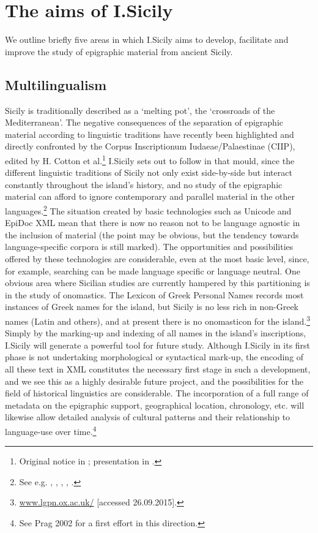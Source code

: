 \documentclass[amsthm,ebook]{saparticle}
\begin{document}
\section{The aims of I.Sicily}
\noindent We outline briefly five areas in which I.Sicily aims to develop, facilitate and improve the study of epigraphic material
from ancient Sicily.




\subsection{Multilingualism}


\noindent Sicily is traditionally described as a `melting pot', the `crossroads of the Mediterranean'. The negative consequences
of the separation of epigraphic material according to linguistic traditions have recently been highlighted and directly
confronted by the Corpus Inscriptionum Iudaeae/Palaestinae (CIIP), edited by H. Cotton et al.\footnote{ Original notice
in \citet{cotton_corpus_1999}; presentation in \citet{cotton_corpus_2010}.} I.Sicily sets out to follow in that mould, since the
different linguistic traditions of Sicily not only exist side-by-side but interact constantly throughout the island’s
history, and no study of the epigraphic material can afford to ignore contemporary and parallel material in the other
languages.\footnote{ See e.g. \citet{manganaro_greco_1993}, \citet{prag_epigraphy_2002}, \citet{salmeri_i_2004}, \citet{korhonen_language_2011}, \citet{tribulato_language_2012}.} The situation
created by basic technologies such as Unicode and EpiDoc XML mean that there is now no reason not to be language
agnostic in the inclusion of material (the point may be obvious, but the tendency towards language-specific corpora is
still marked). The opportunities and possibilities offered by these technologies are considerable, even at the most
basic level, since, for example, searching can be made language specific or language neutral. One obvious area where
Sicilian studies are currently hampered by this partitioning is in the study of onomastics. The Lexicon of Greek
Personal Names records most instances of Greek names for the island, but Sicily is no less rich in non-Greek names
(Latin and others), and at present there is no onomasticon for the island.\footnote{ \url{www.lgpn.ox.ac.uk/} [accessed
26.09.2015].} Simply by the marking-up and indexing of all names in the island’s inscriptions, I.Sicily will generate a
powerful tool for future study. Although I.Sicily in its first phase is not undertaking morphological or syntactical
mark-up, the encoding of all these text in XML constitutes the necessary first stage in such a development, and we see
this as a highly desirable future project, and the possibilities for the field of historical linguistics are
considerable. The incorporation of a full range of metadata on the epigraphic support, geographical location,
chronology, etc. will likewise allow detailed analysis of cultural patterns and their relationship to language-use over
time.\footnote{ See Prag 2002 for a first effort in this direction.}
\end{document}
